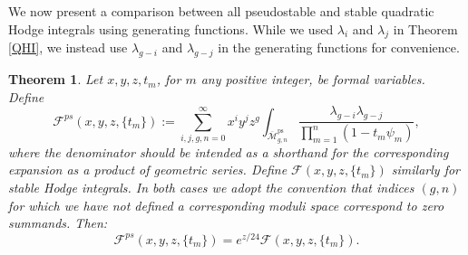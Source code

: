 \documentclass[leqno,12pt]{amsart}
\newtheorem{theorem}{Theorem}[section]
\theoremstyle{remark}
\numberwithin{equation}{section}
\DeclareMathOperator{\ps}{ps}
\begin{document}
\begin{sloppypar}
We now present a comparison between all pseudostable and stable quadratic Hodge integrals using generating functions. While we used $\lambda_i$ and $\lambda_j$ in Theorem \ref{QHI}, we instead use $\lambda_{g-i}$ and $\lambda_{g-j}$ in the generating functions for convenience.
\end{sloppypar}

\begin{theorem}\label{Generating} Let $x,y,z,t_m$, for $m$ any positive integer, be formal variables. Define
$$ 
\mathcal{F}^{ps}(x, y, z, \{t_m\}):=\sum_{i, j, g, n = 0}^\infty x^iy^jz^g \int_{\overline{\mathcal{M}}^{\ps}_{g, n}} \frac{\lambda_{g-i}\lambda_{g-j}}{\prod_{m=1}^n (1 - t_m\psi_m)},
$$
where the denominator should be intended as a shorthand for the corresponding expansion as a product of geometric series. Define $\mathcal{F}(x, y, z, \{t_m\})$ similarly for stable Hodge integrals. In both cases we adopt the convention that indices $(g,n)$ for which we have not defined a corresponding moduli space correspond to zero summands. Then: 
$$
\mathcal{F}^{ps}(x, y, z, \{t_m\}) = e^{z/24}\mathcal{F}(x, y, z, \{t_m\}).
$$
\end{theorem}
\end{document}
